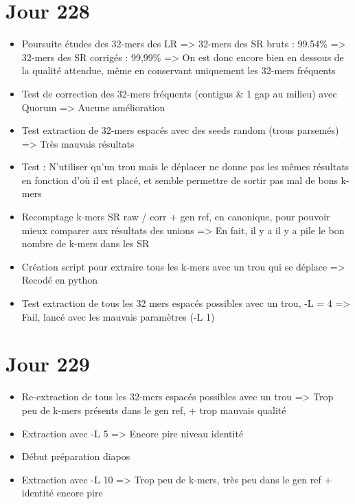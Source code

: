 \documentclass[12pt]{report}
\begin{document}
\section{Jour 228}

\begin{itemize}
	\item Poursuite études des 32-mers des LR
		  => 32-mers des SR bruts : 99.54\%
		  => 32-mers des SR corrigés : 99,99\%
		  => On est donc encore bien en dessous de la qualité attendue, même en conservant uniquement les 32-mers fréquents
		  
	\item Test de correction des 32-mers fréquents (contigus & 1 gap au milieu) avec Quorum => Aucune amélioration
	
	\item Test extraction de 32-mers espacés avec des seeds random (trous parsemés) => Très mauvais résultats
	
	\item Test : N'utiliser qu'un trou mais le déplacer ne donne pas les mêmes résultats en fonction d'où il est placé,
		  et semble permettre de sortir pas mal de bons k-mers
	
	\item Recomptage k-mers SR raw / corr + gen ref, en canonique, pour pouvoir mieux comparer aux résultats des unions
		  => En fait, il y a il y a pile le bon nombre de k-mers dans les SR
	
	\item Création script pour extraire tous les k-mers avec un trou qui se déplace => Recodé en python
	
	\item Test extraction de tous les 32 mers espacés possibles avec un trou, -L = 4 => Fail, lancé avec les mauvais paramètres (-L 1)
\end{itemize}

\section{Jour 229}

\begin{itemize}
	\item Re-extraction de tous les 32-mers espacés possibles avec un trou => Trop peu de k-mers présents dans le gen ref,
		  + trop mauvais qualité
		  
	\item Extraction avec -L 5 => Encore pire niveau identité 
	
	\item Début préparation diapos
	
	\item Extraction avec -L 10 => Trop peu de k-mers, très peu dans le gen ref + identité encore pire
\end{itemize}
\end{document}
